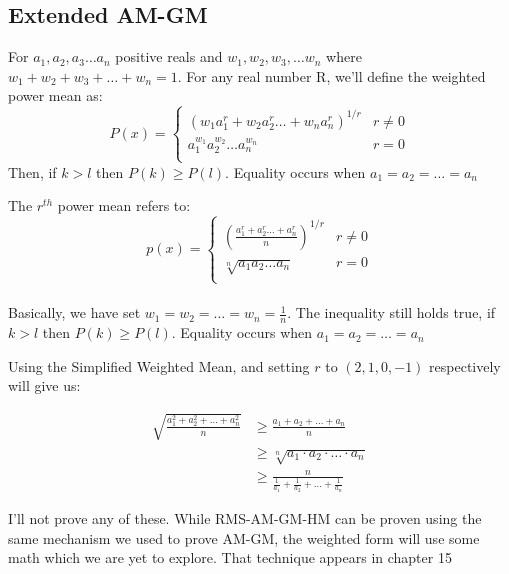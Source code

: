 \subsection{Extended AM-GM}
\begin{theorem}
     For $a_1,a_2,a_3 \dots a_n$ positive reals and $w_1,w_2, w_3, \dots w_n$ where $w_1+w_2+w_3+\dots +w_n=1$. For any real number R, we'll define the weighted power mean as:\\
   \[P(x)=\begin{cases}
       (w_1a_1^r+w_2a_2^r \dots +w_na_n^r)^{1/r} & r \neq 0\\
       a_1^{w_1}a_2^{w_2} \dots a_n^{w_n} & r=0\\
   \end{cases}\]
   Then, if $k>l$ then $P(k) \geq P(l)$. Equality occurs when $a_1=a_2=\dots=a_n$\\
    \end{theorem}
\begin{theorem}
     The $r^{th}$ power mean refers to:\\
    \[p(x)=\begin{cases}
       (\frac{a_1^r+a_2^r \dots +a_n^r}{n})^{1/r} & r \neq 0\\
       \sqrt[n]{a_1a_2\dots a_n} & r=0\\
   \end{cases}\]\\
   Basically, we have set $w_1=w_2=\dots=w_n=\frac{1}{n}$. The inequality still holds true, if $k>l$ then $P(k) \geq P(l)$. Equality occurs when $a_1=a_2=\dots=a_n$
\end{theorem}
Using the Simplified Weighted Mean, and setting $r$ to $(2,1,0,-1)$ respectively will give us:\\
\begin{theorem}[RMS-AM-GM-HM]
    \begin{align*}
\sqrt{\frac{a_1^2 + a_2^2 + \ldots + a_n^2}{n}} &\geq \frac{a_1 + a_2 + \ldots + a_n}{n} \\
&\geq \sqrt[n]{a_1 \cdot a_2 \cdot \ldots \cdot a_n} \\
&\geq \frac{n}{\frac{1}{a_1} + \frac{1}{a_2} + \ldots + \frac{1}{a_n}}
\end{align*}
\end{theorem}
I'll not prove any of these. While RMS-AM-GM-HM can be proven using the same mechanism we used to prove AM-GM, the weighted form will use some math which we are yet to explore. That technique appears in chapter 15\\
